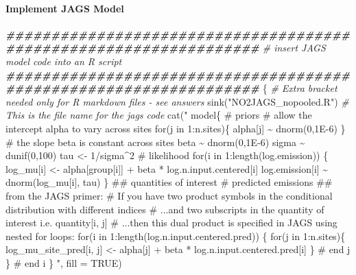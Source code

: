 \documentclass[
]{article}
\newenvironment{Shaded}{\begin{snugshade}}{\end{snugshade}}
\newcommand{\AttributeTok}[1]{\textcolor[rgb]{0.77,0.63,0.00}{#1}}
\newcommand{\CommentTok}[1]{\textcolor[rgb]{0.56,0.35,0.01}{\textit{#1}}}
\newcommand{\ConstantTok}[1]{\textcolor[rgb]{0.00,0.00,0.00}{#1}}
\newcommand{\DocumentationTok}[1]{\textcolor[rgb]{0.56,0.35,0.01}{\textbf{\textit{#1}}}}
\newcommand{\FunctionTok}[1]{\textcolor[rgb]{0.00,0.00,0.00}{#1}}
\newcommand{\NormalTok}[1]{#1}
\newcommand{\StringTok}[1]{\textcolor[rgb]{0.31,0.60,0.02}{#1}}
\begin{document}
\hypertarget{implement-jags-model-1}{%
\paragraph{Implement JAGS Model}\label{implement-jags-model-1}}

\begin{Shaded}
\begin{Highlighting}[]
\DocumentationTok{\#\#\#\#\#\#\#\#\#\#\#\#\#\#\#\#\#\#\#\#\#\#\#\#\#\#\#\#\#\#\#\#\#\#\#\#\#\#\#\#\#\#\#\#\#\#\#\#\#\#\#\#\#\#\#\#\#\#\#\#\#\#\#\#\#\#}
\CommentTok{\# insert JAGS model code into an R script}
\DocumentationTok{\#\#\#\#\#\#\#\#\#\#\#\#\#\#\#\#\#\#\#\#\#\#\#\#\#\#\#\#\#\#\#\#\#\#\#\#\#\#\#\#\#\#\#\#\#\#\#\#\#\#\#\#\#\#\#\#\#\#\#\#\#\#\#\#\#\#}
\NormalTok{\{ }\CommentTok{\# Extra bracket needed only for R markdown files {-} see answers}
  \FunctionTok{sink}\NormalTok{(}\StringTok{"NO2JAGS\_nopooled.R"}\NormalTok{) }\CommentTok{\# This is the file name for the jags code}
  \FunctionTok{cat}\NormalTok{(}\StringTok{"}
\StringTok{  model\{}
\StringTok{    \# priors}
\StringTok{    \# allow the intercept alpha to vary across sites}
\StringTok{      for(j in 1:n.sites)\{}
\StringTok{        alpha[j] \textasciitilde{} dnorm(0,1E{-}6) }
\StringTok{      \}}
\StringTok{    \# the slope beta is constant across sites}
\StringTok{    beta \textasciitilde{} dnorm(0,1E{-}6)}
\StringTok{    sigma \textasciitilde{} dunif(0,100)}
\StringTok{    tau \textless{}{-} 1/sigma\^{}2}
\StringTok{  }
\StringTok{    \# likelihood}
\StringTok{    for(i in 1:length(log.emission)) \{}
\StringTok{      log\_mu[i] \textless{}{-} alpha[group[i]] + beta * log.n.input.centered[i]}
\StringTok{      log.emission[i] \textasciitilde{} dnorm(log\_mu[i], tau)}
\StringTok{    \}}
\StringTok{  }
\StringTok{    \#\# quantities of interest}
\StringTok{      \# predicted emissions}
\StringTok{      \#\# from the JAGS primer: }
\StringTok{        \# If you have two product symbols in the conditional distribution with different indices}
\StringTok{          \# ...and two subscripts in the quantity of interest i.e. quantity[i, j] }
\StringTok{          \# ...then this dual product is specified in JAGS using nested for loops:}
\StringTok{      for(i in 1:length(log.n.input.centered.pred)) \{}
\StringTok{        for(j in 1:n.sites)\{}
\StringTok{          log\_mu\_site\_pred[i, j] \textless{}{-} alpha[j] + beta * log.n.input.centered.pred[i]}
\StringTok{        \} \# end j}
\StringTok{      \} \# end i}
\StringTok{  \}}
\StringTok{  "}\NormalTok{, }\AttributeTok{fill =} \ConstantTok{TRUE}\NormalTok{)}

\end{Highlighting}
\end{Shaded}
\end{document}
